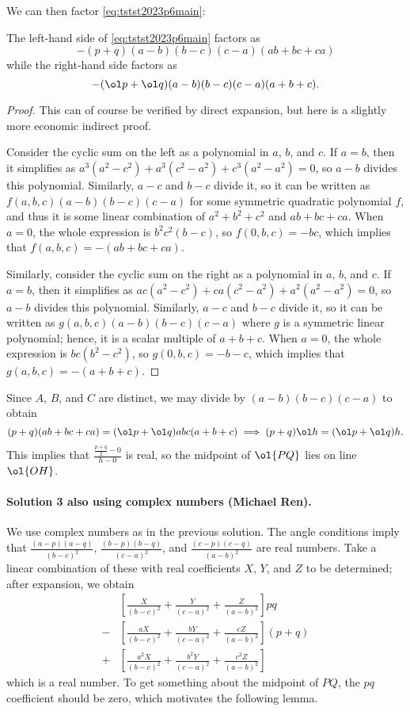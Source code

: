 We can then factor \eqref{eq:tstst2023p6main}:
\begin{claim*}
  The left-hand side of \eqref{eq:tstst2023p6main} factors as
  \[ -(p+q)(a-b)(b-c)(c-a)(ab+bc+ca) \]
  while the right-hand side factors as
  \[ -(\ol p + \ol q)(a-b)(b-c)(c-a)(a+b+c). \]
\end{claim*}
\begin{proof}
  This can of course be verified by direct expansion, but here is a slightly
  more economic indirect proof.

  Consider the cyclic sum on the left as a polynomial in $a$, $b$, and $c$.
  If $a=b$, then it simplifies as $a^3(a^2-c^2)+a^3(c^2-a^2)+c^3(a^2-a^2)=0$,
  so $a-b$ divides this polynomial.
  Similarly, $a-c$ and $b-c$ divide it, so it can be written as
  $f(a,b,c)(a-b)(b-c)(c-a)$ for some symmetric quadratic polynomial $f$,
  and thus it is some linear combination of $a^2+b^2+c^2$ and $ab+bc+ca$.
  When $a=0$, the whole expression is $b^2c^2(b-c)$, so $f(0,b,c)=-bc$, which
  implies that $f(a,b,c)=-(ab+bc+ca)$.

  Similarly, consider the cyclic sum on the right as a polynomial in $a$, $b$, and $c$.
  If $a=b$, then it simplifies as $ac(a^2-c^2)+ca(c^2-a^2)+a^2(a^2-a^2)=0$,
  so $a-b$ divides this polynomial.
  Similarly, $a-c$ and $b-c$ divide it, so it can be written as
  $g(a,b,c)(a-b)(b-c)(c-a)$ where $g$ is a symmetric linear polynomial;
  hence, it is a scalar multiple of $a+b+c$.
  When $a=0$, the whole expression is $bc(b^2-c^2)$, so $g(0,b,c)=-b-c$,
  which implies that $g(a,b,c)=-(a+b+c)$.
\end{proof}

Since $A$, $B$, and $C$ are distinct,
we may divide by $(a-b)(b-c)(c-a)$ to obtain
\[
  (p+q)(ab+bc+ca)=(\ol p+\ol q)abc(a+b+c) \implies
  (p+q)\ol h=(\ol p+\ol q)h.
\]
This implies that $\frac{\frac{p+q}2-0}{h-0}$ is real,
so the midpoint of $\ol{PQ}$ lies on line $\ol{OH}$.

\paragraph{Solution 3 also using complex numbers (Michael Ren).}
We use complex numbers as in the previous solution.
The angle conditions imply that
$\frac{(a-p)(a-q)}{(b-c)^2}$, $\frac{(b-p)(b-q)}{(c-a)^2}$,
and $\frac{(c-p)(c-q)}{(a-b)^2}$ are real numbers.
Take a linear combination of these with real coefficients
$X$, $Y$, and $Z$ to be determined; after expansion, we obtain
\begin{align*}
  &\left[\frac{X}{(b-c)^2}+\frac{Y}{(c-a)^2}+\frac{Z}{(a-b)^2}\right]pq \\
  - &\left[\frac{aX}{(b-c)^2}+\frac{bY}{(c-a)^2}+\frac{cZ}{(a-b)^2}\right](p+q)
  \\
  + &\left[\frac{a^2X}{(b-c)^2}+\frac{b^2Y}{(c-a)^2}+\frac{c^2Z}{(a-b)^2}\right]
\end{align*}
which is a real number. To get something about the midpoint of $PQ$, the $pq$
coefficient should be zero, which motivates the following lemma.

